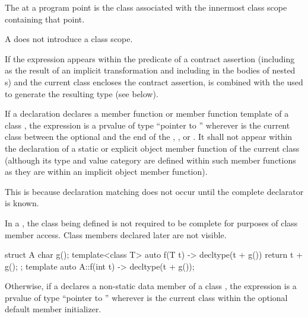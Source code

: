 \pnum
The  at a program point is
the class associated with the innermost class scope containing that point.
\begin{note}
A  does not introduce a class scope.
\end{note}

\pnum
If the expression 
appears within the predicate of a contract assertion
(including as the result of an implicit transformation
and including in the bodies of nested s)
and the current class
encloses the contract assertion,
 is combined with the 
used to generate the resulting type (see below).

\pnum
If a declaration declares a member function or member function template of a
class , the expression  is a prvalue of type ``pointer to
 ''
wherever  is the current class
between the optional
 and the end of the ,
, or . It shall not appear within
the declaration of
a static or explicit object member function
of the current class (although its type and value category
are defined within such member functions as they are within an implicit object
member function).
\begin{note}
This is because declaration matching does not
occur until the complete declarator is known.
\end{note}
\begin{note}
In a ,
the class being defined is not required to be complete
for purposes of class member access.
Class members declared later are not visible.
\begin{example}
\begin{codeblock}
struct A {
  char g();
  template<class T> auto f(T t) -> decltype(t + g())
    { return t + g(); }
};
template auto A::f(int t) -> decltype(t + g());
\end{codeblock}
\end{example}
\end{note}

\pnum
Otherwise, if a  declares a non-static data
member of a class , the expression  is
a prvalue of type ``pointer to ''
wherever  is the current class
within the
optional default member initializer.

